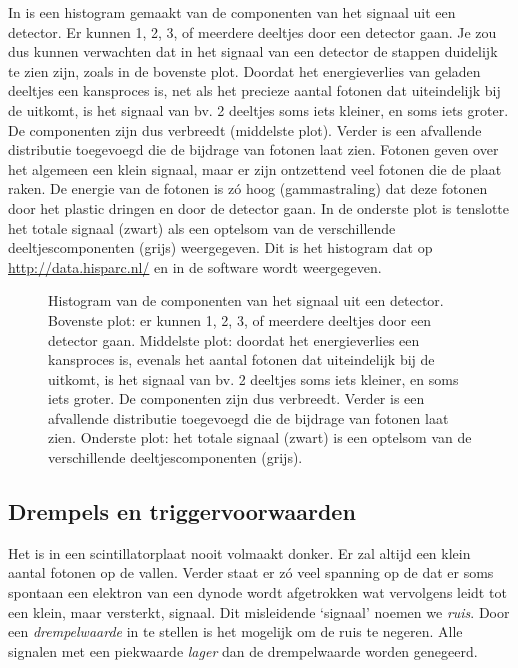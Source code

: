 In  is een histogram gemaakt van de
componenten van het signaal uit een \hisparc detector.  Er kunnen 1, 2, 3,
of meerdere deeltjes door een detector gaan.  Je zou dus kunnen verwachten
dat in het signaal van een \hisparc detector de stappen duidelijk te zien
zijn, zoals in de bovenste plot.  Doordat het energieverlies van geladen
deeltjes een kansproces is, net als het precieze aantal fotonen dat
uiteindelijk bij de \pmt uitkomt, is het signaal van bv. 2 deeltjes soms
iets kleiner, en soms iets groter.  De componenten zijn dus verbreedt
(middelste plot).  Verder is een afvallende distributie toegevoegd die de
bijdrage van fotonen laat zien.  Fotonen geven over het algemeen een klein
signaal, maar er zijn ontzettend veel fotonen die de plaat raken.  De
energie van de fotonen is zó hoog (gammastraling) dat deze fotonen door
het plastic dringen en door de detector gaan.  In de onderste plot is
tenslotte het totale signaal (zwart) als een optelsom van de verschillende
deeltjescomponenten (grijs) weergegeven.  Dit is het histogram dat op
\url{http://data.hisparc.nl/} en in de \daq software wordt weergegeven.

\begin{figure}
\centering
%
\caption{Histogram van de componenten van het signaal uit een \hisparc
detector.  Bovenste plot: er kunnen 1, 2, 3, of meerdere deeltjes door een
detector gaan.  Middelste plot: doordat het energieverlies een kansproces
is, evenals het aantal fotonen dat uiteindelijk bij de \pmt uitkomt, is
het signaal van bv. 2 deeltjes soms iets kleiner, en soms iets groter.  De
componenten zijn dus verbreedt.  Verder is een afvallende distributie
toegevoegd die de bijdrage van fotonen laat zien.  Onderste plot: het
totale signaal (zwart) is een optelsom van de verschillende
deeltjescomponenten (grijs).}
\label{fig:spectrum_componenten}
\end{figure}


\subsection{Drempels en triggervoorwaarden}

Het is in een scintillatorplaat nooit volmaakt donker.  Er zal altijd een
klein aantal fotonen op de \pmt vallen.  Verder staat er zó veel spanning
op de \pmt dat er soms spontaan een elektron van een dynode wordt
afgetrokken wat vervolgens leidt tot een klein, maar versterkt, signaal.
Dit misleidende `signaal' noemen we \emph{ruis}.  Door een
\emph{drempelwaarde} in te stellen is het mogelijk om de ruis te negeren.
Alle signalen met een piekwaarde \emph{lager} dan de drempelwaarde worden
genegeerd.

